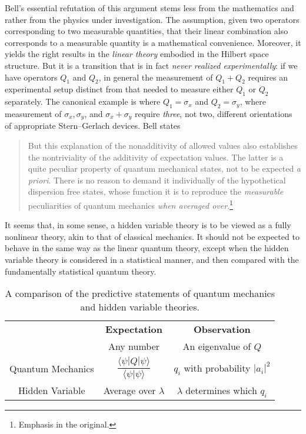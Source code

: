 \documentclass[12pt]{article}
\begin{document}
Bell's essential refutation of this argument stems less from the mathematics and rather from the physics under investigation.  The assumption, given two operators corresponding to two measurable quantities, that their linear combination also corresponds to a measurable quantity is a mathematical convenience.  Moreover, it yields the right results in the \emph{linear theory} embodied in the Hilbert space structure.  But it is a transition that is in fact \emph{never realized experimentally}: if we have operators $Q_1$ and $Q_2$, in general the measurement of $Q_1 + Q_2$ requires an experimental setup distinct from that needed to measure either $Q_1$ or $Q_2$ separately.  The canonical example is where $Q_1 = \sigma_x$ and $Q_2 = \sigma_y$, where measurement of $\sigma_x, \sigma_y$, and $\sigma_x + \sigma_y$ require \emph{three}, not two, different orientations of appropriate Stern--Gerlach devices.  Bell states
\begin{quote}
  But this explanation of the nonadditivity of allowed values also establishes the nontriviality of the additivity of expectation values. The latter is a quite peculiar property of quantum mechanical states, not to be expected \emph{a priori}. There is no reason to demand it individually of the hypothetical dispersion free states, whose function it is to reproduce the \emph{measurable} peculiarities of quantum mechanics \emph{when averaged over}.\footnote{Emphasis in the original.}
\end{quote}

It seems that, in some sense, a hidden variable theory is to be viewed as a fully nonlinear theory, akin to that of classical mechanics.  It should not be expected to behave in the same way as the linear quantum theory, except when the hidden variable theory is considered in a statistical manner, and then compared with the fundamentally statistical quantum theory.

\begin{table}
  \label{tab:vonneumann}
  \caption{A comparison of the predictive statements of quantum mechanics and hidden variable theories.}
  \begin{center}
    \begin{tabular}{ccc}
      \toprule
      & \textbf{Expectation} & \textbf{Observation} \\
      & Any number & An eigenvalue of $Q$ \\
      \midrule
      Quantum Mechanics & $\dfrac{\langle \psi | Q | \psi \rangle}{\langle \psi | \psi \rangle}$ & $q_i$ with probability $|a_i|^2$\\
      Hidden Variable & Average over $\lambda$ & $\lambda$ determines which $q_i$ \\
      \bottomrule
    \end{tabular}
  \end{center}
\end{table}
\end{document}
